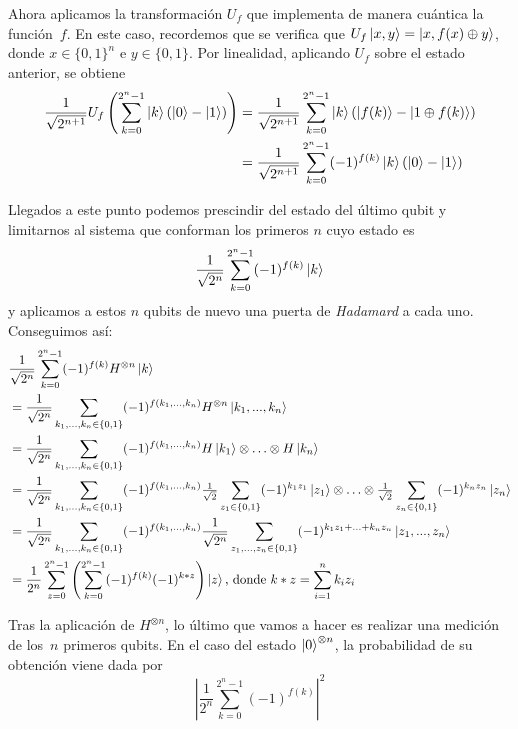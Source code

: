 Ahora aplicamos la transformación $U_f$ que implementa de manera cuántica la función~$f$. En este caso, recordemos que se verifica que $U_f\left|x,y\right\rangle=\left|x,f(x)\oplus y\right\rangle$, donde $x\in\{0,1\}^n$ e $y\in\{0,1\}$. Por linealidad, aplicando $U_f$ sobre el estado anterior, se obtiene
\[
\begin{split}
\dfrac{1}{\sqrt{2^{n+1}}}U_f\left(\sum_{k=0}^{2^n-1}\left|k\right\rangle(\left|0\right\rangle -\left|1\right\rangle)\right)&=\dfrac{1}{\sqrt{2^{n+1}}}\sum_{k=0}^{2^n-1}\left|k\right\rangle(\left|f(k)\right\rangle -\left|1\oplus f(k)\right\rangle)\\
&=\dfrac{1}{\sqrt{2^{n+1}}}\sum_{k=0}^{2^n-1}(-1)^{f(k)}\left|k\right\rangle(\left|0\right\rangle -\left|1\right\rangle)\\
\end{split}
\]

Llegados a este punto podemos prescindir del estado del último qubit y limitarnos al sistema que conforman los primeros $n$ cuyo estado es
\[\dfrac{1}{\sqrt{2^n}}\sum_{k=0}^{2^n-1}(-1)^{f(k)}\left|k\right\rangle\]
%
y aplicamos a estos $n$ qubits de nuevo una puerta de \textit{Hadamard} a cada uno. Conseguimos así:
\[
\begin{split}
&\dfrac{1}{\sqrt{2^n}}\sum_{k=0}^{2^n-1}(-1)^{f(k)}H^{\otimes n}\left|k\right\rangle\\
&=\dfrac{1}{\sqrt{2^n}}\sum_{k_1,...,k_n\in\{0,1\}}(-1)^{f(k_1,...,k_n)}H^{\otimes n}\left|k_1,...,k_n\right\rangle\\
&=\dfrac{1}{\sqrt{2^n}}\sum_{k_1,...,k_n\in\{0,1\}}(-1)^{f(k_1,...,k_n)}H\left|k_1\right\rangle\otimes\hdots\otimes H\left|k_n\right\rangle\\
&=\dfrac{1}{\sqrt{2^n}}\sum_{k_1,...,k_n\in\{0,1\}}(-1)^{f(k_1,...,k_n)}\tfrac{1}{\sqrt{2}}\sum_{z_1\in\{0,1\}}(-1)^{k_1z_1}\left|z_1\right\rangle\otimes\hdots\otimes \tfrac{1}{\sqrt{2}}\sum_{z_n\in\{0,1\}}(-1)^{k_nz_n}\left|z_n\right\rangle\\
&=\dfrac{1}{\sqrt{2^n}}\sum_{k_1,...,k_n\in\{0,1\}}(-1)^{f(k_1,...,k_n)}\dfrac{1}{\sqrt{2^n}}\sum_{z_1,...,z_n\in\{0,1\}}(-1)^{k_1z_1+\hdots+k_nz_n}\left|z_1,...,z_n\right\rangle\\
&=\dfrac{1}{2^n}\sum_{z=0}^{2^n-1}\left(\sum_{k=0}^{2^n-1}(-1)^{f(k)}(-1)^{k*z}\right)\left|z\right\rangle\textrm{, donde }k*z=\sum_{i=1}^nk_iz_i
\end{split}
\]

Tras la aplicación de $H^{\otimes n}$, lo último que vamos a hacer es realizar una medición de los~$n$ primeros qubits. En el caso del estado $\left|0\right\rangle^{\otimes n}$, la probabilidad de su obtención viene dada por
\begin{equation}
\label{eq:eq61}
\left|\dfrac{1}{2^n}\sum_{k=0}^{2^n-1}(-1)^{f(k)}\right|^2
\end{equation}

